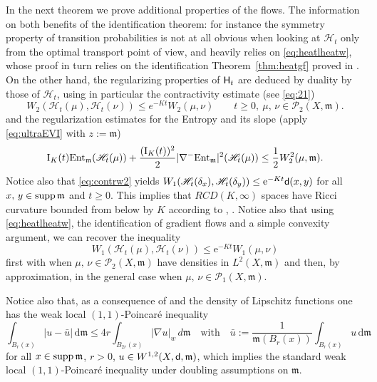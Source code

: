 \documentclass[reqno,11pt]{article}
\numberwithin{equation}{section}
\newcommand{\mm}{{\mbox{\boldmath$m$}}}
\newcommand{\sfd}{{\sf d}}
\newcommand{\rme}{{\mathrm e}}
\newcommand{\supp}{\mathop{\rm supp}\nolimits}   %
\renewcommand{\d}{{\mathrm d}}
\newcommand{\ProbabilitiesTwo}[1]{\mathscr P_2(#1)}     %
\newcommand{\ent}[1]{{\rm Ent}_{\mm}(#1)}              %
\newcommand{\entv}{{\rm Ent}_{\mm}}                    %
\newcommand{\probt}{\ProbabilitiesTwo}
\newcommand{\weakgrad}[1]{|\nabla #1|_w}                %
\newcommand{\rcd}[2]{RCD(#1,#2)}
\newcommand{\heatl}{{\sf H}}
\newcommand{\heatw}{{\mathscr H}}
\renewcommand{\mm}{\mathfrak m}
\begin{document}
In the next theorem we prove additional properties of the flows. The
information on both benefits of the identification theorem: for
instance the symmetry property of transition probabilities is not at
all obvious when looking at $\heatw_t$ only from the optimal
transport point of view, and heavily relies on
\eqref{eq:heatlheatw}, whose proof in turn relies on the
identification Theorem~\ref{thm:heatgf} proved in
\cite{Ambrosio-Gigli-Savare11}. On the other hand, the regularizing
properties of $\heatl_t$ are deduced by duality by those of
$\heatw_t$, using in particular the contractivity estimate (see \eqref{eq:21})
\begin{equation}
\label{eq:contrw2} W_2(\heatw_t(\mu),\heatw_t(\nu))\leq
e^{-Kt}W_2(\mu,\nu)\qquad t\geq0,\ \mu,\,\nu\in\probt {X,\mm}.
\end{equation}
and the regularization estimates for the Entropy and its slope
(apply \eqref{eq:ultraEVI} with $z:=\mm$)
\begin{equation}
  \label{eq:24}
  \mathrm I_K(t)\ent{\heatw_t(\mu)}+\frac {(\mathrm I_K(t))^2}2|\nabla^-\entv|^2(\heatw_t(\mu))
  \le \frac 12 W_2^2(\mu,\mm).
\end{equation}
Notice also that \eqref{eq:contrw2} yields $
W_1(\heatw_t(\delta_x),\heatw_t(\delta_y))\le\rme^{-Kt}\sfd(x,y)$
for all $x,\,y\in\supp\mm$ and $t\geq 0$. This implies that $\rcd
K\infty$ spaces have Ricci curvature bounded from below by $K$
according to \cite{Ollivier09}, \cite{Joulin07}. Notice also that
using \eqref{eq:heatlheatw}, the identification of gradient flows
and a simple convexity argument, we can recover the inequality
$$
W_1(\heatw_t(\mu),\heatw_t(\nu))\leq\rme^{-Kt}W_1(\mu,\nu)
$$
first with when $\mu,\,\nu\in\probt{X,\mm}$ have densities in
$L^2(X,\mm)$ and then, by approximation, in the general case when
$\mu,\,\nu\in {\mathscr P}_1(X,\mm)$.

Notice also that, as a consequence of \cite[Theorem~1.3]{Rajala11}
and the density of Lipschitz functions one has the weak local
$(1,1)$-Poincar\'e inequality
$$
\int_{B_r(x)} |u-\bar u|\,\d\mm\leq 4r\int_{B_{2r}(x)}\weakgrad
u\,d\mm\quad\text{with}\quad \bar
u:=\frac{1}{\mm(B_r(x))}\int_{B_r(x)}u\,\d\mm
$$
for all $x\in\supp\mm$, $r>0$, $u\in W^{1,2}(X,\sfd,\mm)$, which
implies the standard weak local $(1,1)$-Poincar\'e inequality under
doubling assumptions on $\mm$.
\end{document}

